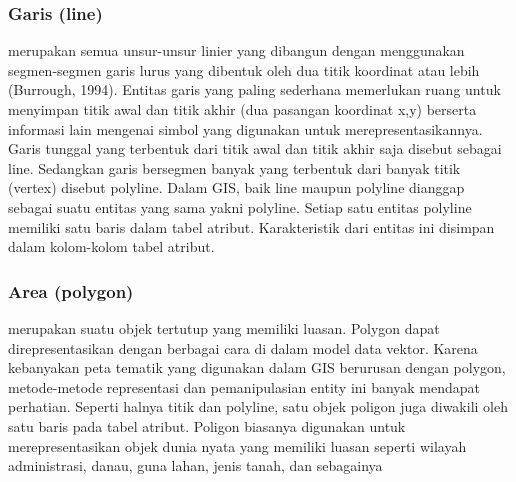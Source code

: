   \subsubsection{Garis (line)}
  merupakan semua unsur-unsur linier yang dibangun dengan menggunakan segmen-segmen garis lurus yang 
  dibentuk oleh dua titik koordinat atau lebih (Burrough, 1994). 
  Entitas garis yang paling sederhana memerlukan ruang untuk menyimpan titik awal dan titik akhir (dua pasangan koordinat x,y) 
  berserta informasi lain mengenai simbol yang digunakan untuk merepresentasikannya. 
  Garis tunggal yang terbentuk dari titik awal dan titik akhir saja disebut sebagai line. 
  Sedangkan garis bersegmen banyak yang terbentuk dari banyak titik (vertex) disebut polyline. 
  Dalam GIS, baik line maupun polyline dianggap sebagai suatu entitas yang sama yakni polyline. 
  Setiap satu entitas polyline memiliki satu baris dalam tabel atribut. 
  Karakteristik dari entitas ini disimpan dalam kolom-kolom tabel atribut. 
  
  \subsubsection{Area (polygon)}
  merupakan suatu objek tertutup yang memiliki luasan. Polygon dapat direpresentasikan dengan 
  berbagai cara di dalam model data vektor. Karena kebanyakan peta tematik yang digunakan dalam GIS berurusan dengan polygon,
  metode-metode representasi dan pemanipulasian entity ini banyak mendapat perhatian. 
  Seperti halnya titik dan polyline, satu objek poligon juga diwakili oleh satu baris pada tabel atribut. 
  Poligon biasanya digunakan untuk merepresentasikan objek dunia nyata yang memiliki luasan seperti 
  wilayah administrasi, danau, guna lahan, jenis tanah, dan sebagainya
 
